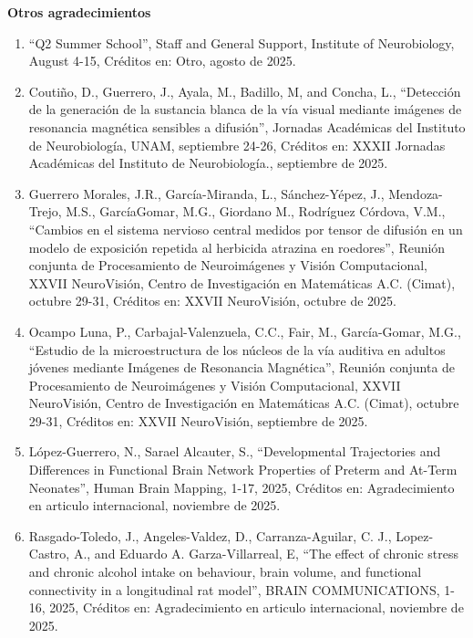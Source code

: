 {\large \textbf{Otros agradecimientos}}

\hrulefill

\begin{enumerate}

\item “Q2 Summer School”, Staff and General Support, Institute of Neurobiology, August 4-15, Créditos en: Otro, agosto de 2025.

\item Coutiño, D., Guerrero, J., Ayala, M., Badillo, M, and Concha, L., “Detección de la generación de la sustancia blanca de la vía visual 
mediante imágenes de resonancia magnética sensibles a difusión”, Jornadas Académicas del Instituto de Neurobiología, UNAM, septiembre 24-26, 
Créditos en: XXXII Jornadas Académicas del Instituto de Neurobiología., septiembre de 2025.

\item Guerrero Morales, J.R., García-Miranda, L., Sánchez-Yépez, J., Mendoza-Trejo, M.S., GarcíaGomar, M.G., Giordano M., Rodríguez Córdova, 
V.M., 
“Cambios en el sistema nervioso central medidos por tensor de difusión en un modelo de exposición repetida al herbicida atrazina en 
roedores”, Reunión conjunta de Procesamiento de Neuroimágenes y Visión Computacional, XXVII NeuroVisión, Centro de Investigación en 
Matemáticas A.C. (Cimat), octubre 29-31, Créditos en: XXVII NeuroVisión, octubre de 2025.

\item Ocampo Luna, P., Carbajal-Valenzuela, C.C., Fair, M., García-Gomar, M.G., “Estudio de la microestructura de los núcleos de la vía 
auditiva en 
adultos jóvenes mediante Imágenes de Resonancia Magnética”, Reunión conjunta de Procesamiento de Neuroimágenes y Visión Computacional, XXVII 
NeuroVisión, Centro de Investigación en Matemáticas A.C. (Cimat), octubre 29-31, Créditos en: XXVII NeuroVisión, septiembre de 2025.

\item López-Guerrero, N., Sarael Alcauter, S., “Developmental Trajectories and Differences in Functional Brain Network Properties of Preterm 
and 
At-Term Neonates”, Human Brain Mapping, 1-17, 2025, Créditos en: Agradecimiento en articulo internacional, noviembre de 2025.

\item Rasgado-Toledo, J., Angeles-Valdez, D., Carranza-Aguilar, C. J., Lopez-Castro, A., and Eduardo A. Garza-Villarreal, E, “The effect of 
chronic 
stress and chronic alcohol intake on behaviour, brain volume, and functional connectivity in a longitudinal rat model”, BRAIN COMMUNICATIONS, 
1-16, 2025, Créditos en: Agradecimiento en articulo internacional, noviembre de 2025.


\end{enumerate}
